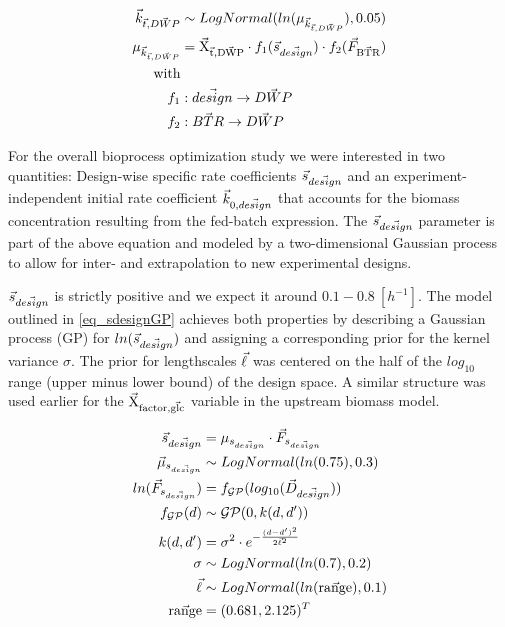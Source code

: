 \documentclass[sn-standardnature]{sn-jnl}%
\def\vec{\mathaccent "017E\relax }
\theoremstyle{thmstyleone}%
\theoremstyle{thmstyletwo}%
\theoremstyle{thmstylethree}%
\begin{document}
\begin{equation}
\begin{aligned}
    \vec{k}_{\vec{t},\vec{DWP}} &\sim LogNormal( ln(\mu_{\vec{k}_{\vec{t},\vec{DWP}}}), 0.05 ) \\
    \mu_{\vec{k}_{\vec{t},\vec{DWP}}} &= \mathrm{\vec{X}_{\vec{t},\vec{DWP}}} \cdot f_1( \vec{s}_{\vec{design}} ) \cdot f_2(\vec{F}_\mathrm{\vec{BTR}}) \\
    \textrm{with} \\
    f_1 &: \vec{design} \rightarrow \vec{DWP} \\
    f_2 &: \vec{BTR} \rightarrow \vec{DWP} \\
\end{aligned}
\label{eq_kdwp}
\end{equation}

For the overall bioprocess optimization study we were interested in two quantities:
Design-wise specific rate coefficients $\vec{s}_{\vec{design}}$ and an experiment-independent initial rate coefficient $\vec{k}_{0,\vec{design}}$ that accounts for the biomass concentration resulting from the fed-batch expression.
The $\vec{s}_{\vec{design}}$ parameter is part of the above equation and modeled by a two-dimensional Gaussian process to allow for inter- and extrapolation to new experimental designs.

$\vec{s}_{\vec{design}}$ is strictly positive and we expect it around $0.1-0.8\ [h^{-1}]$.
The model outlined in \eqref{eq_sdesignGP} achieves both properties by describing a Gaussian process (GP) for $ln(\vec{s}_{\vec{design}})$ and assigning a corresponding prior for the kernel variance $\sigma$.
The prior for lengthscales $\vec{\ell}$ was centered on the half of the $log_{10}$ range (upper minus lower bound) of the design space.
A similar structure was used earlier for the $\mathrm{\vec{X}_{factor,\vec{glc}}}$ variable in the upstream biomass model.

\begin{equation}
\begin{aligned}
    \vec{s}_{\vec{design}} &= \mu_{s_{\vec{design}}} \cdot \vec{F}_{s_{\vec{design}}} \\
    \vec{\mu}_{s_{\vec{design}}} &\sim LogNormal(ln(0.75), 0.3) \\
    ln(\vec{F}_{s_{\vec{design}}}) &= f_\mathcal{GP}( log_{10}(\vec{D}_{\vec{design}}) ) \\
    f_\mathcal{GP}(d) &\sim \mathcal{GP}(0, k(d, d')) \\
    k(d,d') &= \sigma^2 \cdot e^{-\frac{(d-d')^2}{2\vec{\ell}^2}} \\
    \sigma &\sim LogNormal(ln(0.7), 0.2) \\
    \vec{\ell} &\sim LogNormal(ln(\mathrm{\vec{range}}), 0.1) \\
    \vec{\mathrm{range}} &= (0.681, 2.125)^T
\end{aligned}
\label{eq_sdesignGP}
\end{equation}
\end{document}
